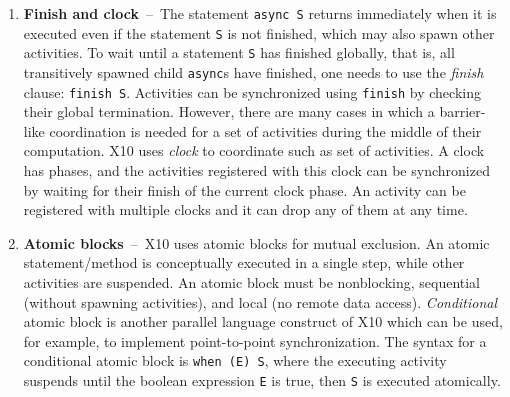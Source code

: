 \begin{enumerate}
\item{\bf Finish and clock}~--~The statement {\tt async S} returns immediately when it is executed even if the statement {\tt S} is not finished, which may also spawn other activities. To wait until a statement {\tt S} has finished globally, that is, all transitively spawned child {\tt async}s have finished, one needs to use the {\it finish} clause: {\tt finish S}. %
Activities can be synchronized using {\tt finish} by checking their global termination. However, there are many cases in which a barrier-like coordination is needed for a set of activities during the middle of their computation. X10 uses {\em clock} to coordinate such as set of activities. A clock has phases, and the activities registered with this clock can be synchronized by waiting for their finish of the current clock phase. An activity can be registered with multiple clocks and it can drop any of them at any time.
\item{\bf Atomic blocks}~--~X10 uses atomic blocks for mutual exclusion. An atomic statement/method is conceptually executed in a single step, while other activities are suspended. An atomic block must be nonblocking, sequential (without spawning activities), and local (no remote data access). %
{\em Conditional} atomic block is another parallel language construct of X10 which can be used, for example, to implement point-to-point synchronization. The syntax for a conditional atomic block is {\tt when (E) S}, where the executing activity suspends until the boolean expression {\tt E} is true, then {\tt S} is executed atomically. 
\end{enumerate}


